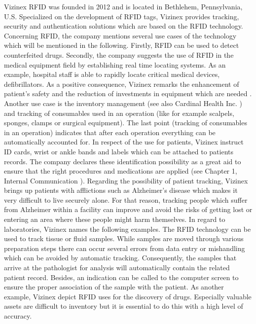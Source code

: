 Vizinex RFID was founded in 2012 and is located in Bethlehem, Pennsylvania, U.S. Specialized on the development of RFID tags, Vizinex provides tracking, security and authentication solutions which are based on the RFID technology. Concerning RFID, the company mentions several use cases of the technology \cite{vizinex} which will be mentioned in the following. Firstly, RFID can be used to detect  counterfeited drugs. Secondly, the company suggests the use of RFID in the medical equipment field by establishing real time locating systems. As an example, hospital staff is able to rapidly locate critical medical devices, defibrillators. As a positive consequence, Vizinex remarks the enhancement of patient's safety and the reduction of investments in equipment which are needed \cite{vizinex}. Another use case is the inventory management (see also Cardinal Health Inc. \pageref{inventory}) and tracking of consumables used in an operation (like for example scalpels, sponges, clamps or surgical equipment). The last point (tracking of consumables in an operation) indicates that after each operation everything can be automatically accounted for. In respect of the use for patients, Vizinex instruct ID cards, wrist or ankle bands and labels which can be attached to patients records. The company declares these identification possibility as a great aid to ensure that the right procedures and medications are applied (see Chapter 1, Internal Communication \pageref{Kap1}). Regarding the possibility of patient tracking, Vizinex brings up patients with afflictions such as Alzheimer's disease which makes it very difficult to live securely alone. For that reason, tracking people which suffer from Alzheimer within a facility can improve and avoid the risks of getting lost or entering an area where these people might harm themselves. In regard to laboratories, Vizinex names the following examples. The RFID technology can be used to track tissue or fluid samples. While samples are moved through various preparation steps there can occur several errors from data entry or mishandling which can be avoided by automatic tracking. Consequently, the samples that arrive at the pathologist for analysis will automatically contain the related patient record. Besides, an indication can be called to the computer screen to ensure the proper association of the sample with the patient. 
As another example, Vizinex depict RFID uses for the discovery of drugs. Especially valuable assets are difficult to inventory but it is essential to do this with a high level of accuracy.

